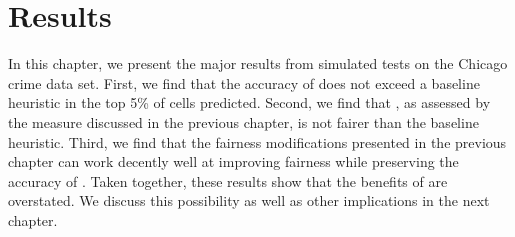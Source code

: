 \chapter{Results}\label{ch:results}

In this chapter, we present the major results from simulated tests on the Chicago crime data set. First, we find that the accuracy of \pp does not exceed a baseline heuristic in the top 5\% of cells predicted. Second, we find that \pp, as assessed by the measure discussed in the previous chapter, is not fairer than the baseline heuristic. Third, we find that the fairness modifications presented in the previous chapter can work decently well at improving fairness while preserving the accuracy of \pp. Taken together, these results show that the benefits of \pp are overstated. We discuss this possibility as well as other implications in the next chapter.

